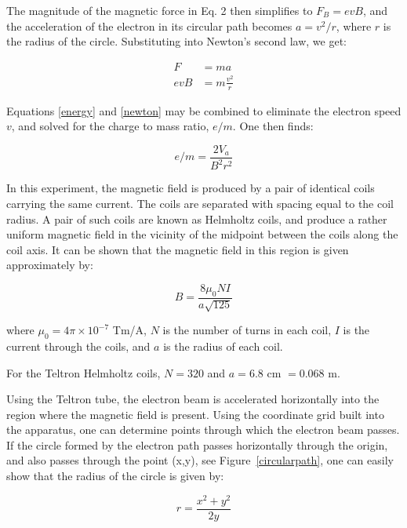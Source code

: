 \documentclass{article}
\begin{document}
The magnitude of the magnetic force in Eq. 2 then simplifies to
$F_{B }= evB$, and the acceleration of the electron in its
circular path becomes $a = v^{2}/r$, where $r$ is the radius
of the circle. Substituting into Newton's second law,
we get:


\begin{align}
\label{newton}
F &= ma \nonumber \\
evB &= m\frac{v^{2}}{r}
\end{align}

Equations \ref{energy} and \ref{newton} may be combined to eliminate the electron speed $v$, and
solved for the charge to mass ratio, $e/m$. One then finds:

\begin{equation}
\label{eom}
\boxed{ e/m = \frac{2V_a}{B^2r^2} }
\end{equation}

In this experiment, the magnetic field is produced by a pair of
identical coils carrying the same current. The coils are separated with
spacing equal to the coil radius. A pair of such coils are known as
Helmholtz coils, and produce a rather uniform magnetic field in the
vicinity of the midpoint between the coils along the coil axis. It can
be shown that the magnetic field in this region is given approximately
by:

\begin{equation}
\label{helmholtz}
\boxed{ B=\frac{8 \mu_0 N I}{a \sqrt{125}} }
\end{equation}

where $\mu_0 = 4\pi \times 10^{-7} $ Tm/A, $N$ is the number of turns in each coil, $I$ is the current
through the coils, and $a$ is the radius of each coil.

For the Teltron Helmholtz coils, $N = 320$ and $a = 6.8$ cm $= 0.068$ m.

Using the Teltron tube, the electron beam is accelerated horizontally
into the region where the magnetic field is present. Using the
coordinate grid built into the apparatus, one can determine points
through which the electron beam passes. If the circle formed by the
electron path passes horizontally through the origin, and also passes
through the point (x,y), see Figure~\ref{circularpath}, one can easily show
that the radius of the circle is given by:

\begin{equation}
\label{circle}
\boxed{ r=\frac{x^2+y^2}{2y} }
\end{equation}
\end{document}
